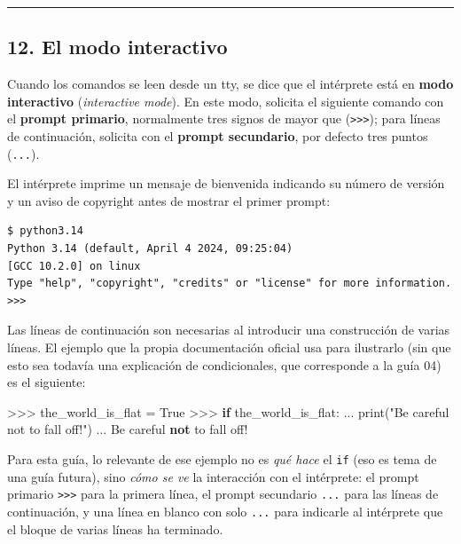 \documentclass[
  doc,
  floatsintext,
  longtable,
  a4paper,
  nolmodern,
  notxfonts,
  notimes,
  12pt,
  colorlinks=true,linkcolor=blue,citecolor=blue,urlcolor=blue]{apa7}
\newenvironment{Shaded}{\begin{snugshade}}{\end{snugshade}}
\newcommand{\BuiltInTok}[1]{\textcolor[rgb]{0.00,0.23,0.31}{#1}}
\newcommand{\ControlFlowTok}[1]{\textcolor[rgb]{0.00,0.23,0.31}{\textbf{#1}}}
\newcommand{\KeywordTok}[1]{\textcolor[rgb]{0.00,0.23,0.31}{\textbf{#1}}}
\newcommand{\NormalTok}[1]{\textcolor[rgb]{0.00,0.23,0.31}{#1}}
\newcommand{\OperatorTok}[1]{\textcolor[rgb]{0.37,0.37,0.37}{#1}}
\newcommand{\StringTok}[1]{\textcolor[rgb]{0.13,0.47,0.30}{#1}}
\newcommand{\VariableTok}[1]{\textcolor[rgb]{0.07,0.07,0.07}{#1}}
\begin{document}
\begin{center}\rule{0.5\linewidth}{0.5pt}\end{center}

\subsection{12. El modo interactivo}\label{el-modo-interactivo}

Cuando los comandos se leen desde un tty, se dice que el intérprete está
en \textbf{modo interactivo} (\emph{interactive mode}). En este modo,
solicita el siguiente comando con el \textbf{prompt primario},
normalmente tres signos de mayor que
(\texttt{\textgreater{}\textgreater{}\textgreater{}}); para líneas de
continuación, solicita con el \textbf{prompt secundario}, por defecto
tres puntos (\texttt{...}).

El intérprete imprime un mensaje de bienvenida indicando su número de
versión y un aviso de copyright antes de mostrar el primer prompt:

\begin{verbatim}
$ python3.14
Python 3.14 (default, April 4 2024, 09:25:04)
[GCC 10.2.0] on linux
Type "help", "copyright", "credits" or "license" for more information.
>>>
\end{verbatim}

Las líneas de continuación son necesarias al introducir una construcción
de varias líneas. El ejemplo que la propia documentación oficial usa
para ilustrarlo (sin que esto sea todavía una explicación de
condicionales, que corresponde a la guía 04) es el siguiente:

\begin{Shaded}
\begin{Highlighting}[]
\OperatorTok{\textgreater{}\textgreater{}\textgreater{}}\NormalTok{ the\_world\_is\_flat }\OperatorTok{=} \VariableTok{True}
\OperatorTok{\textgreater{}\textgreater{}\textgreater{}} \ControlFlowTok{if}\NormalTok{ the\_world\_is\_flat:}
\NormalTok{...     }\BuiltInTok{print}\NormalTok{(}\StringTok{"Be careful not to fall off!"}\NormalTok{)}
\NormalTok{...}
\NormalTok{Be careful }\KeywordTok{not}\NormalTok{ to fall off}\OperatorTok{!}
\end{Highlighting}
\end{Shaded}

Para esta guía, lo relevante de ese ejemplo no es \emph{qué hace} el
\texttt{if} (eso es tema de una guía futura), sino \emph{cómo se ve} la
interacción con el intérprete: el prompt primario
\texttt{\textgreater{}\textgreater{}\textgreater{}} para la primera
línea, el prompt secundario \texttt{...} para las líneas de
continuación, y una línea en blanco con solo \texttt{...} para indicarle
al intérprete que el bloque de varias líneas ha terminado.
\end{document}
